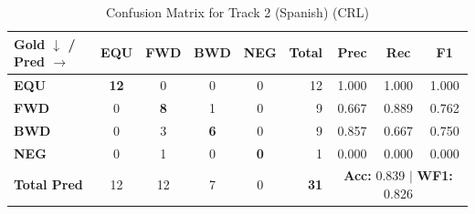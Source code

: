\begin{table}[ht]
\centering
\small
\begin{tabular}{l|cccc|r|ccc}
\toprule
\textbf{Gold $\downarrow$ / Pred $\rightarrow$} & \textbf{EQU} & \textbf{FWD} & \textbf{BWD} & \textbf{NEG} & \textbf{Total} & \textbf{Prec} & \textbf{Rec} & \textbf{F1} \\
\midrule
\textbf{EQU} & \textbf{12} & 0 & 0 & 0 & 12 & 1.000 & 1.000 & 1.000 \\
\textbf{FWD} & 0 & \textbf{8} & 1 & 0 & 9 & 0.667 & 0.889 & 0.762 \\
\textbf{BWD} & 0 & 3 & \textbf{6} & 0 & 9 & 0.857 & 0.667 & 0.750 \\
\textbf{NEG} & 0 & 1 & 0 & \textbf{0} & 1 & 0.000 & 0.000 & 0.000 \\
\midrule
\textbf{Total Pred} & 12 & 12 & 7 & 0 & \textbf{31} & \multicolumn{3}{c}{\textbf{Acc:} 0.839 $\mid$ \textbf{WF1:} 0.826} \\
\bottomrule
\end{tabular}
\caption{Confusion Matrix for Track 2 (Spanish) (CRL)}
\label{tab:confusion_matrix}
\end{table}